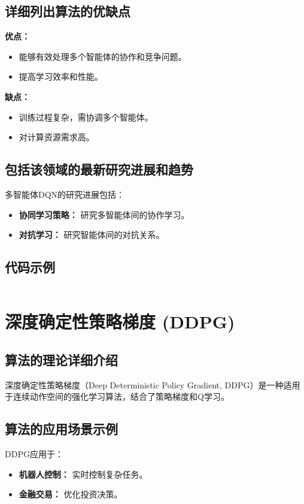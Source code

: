 \subsection*{详细列出算法的优缺点}
\textbf{优点：}
\begin{itemize}
    \item 能够有效处理多个智能体的协作和竞争问题。
    \item 提高学习效率和性能。
\end{itemize}

\textbf{缺点：}
\begin{itemize}
    \item 训练过程复杂，需协调多个智能体。
    \item 对计算资源需求高。
\end{itemize}

\subsection*{包括该领域的最新研究进展和趋势}
多智能体DQN的研究进展包括：
\begin{itemize}
    \item \textbf{协同学习策略：} 研究多智能体间的协作学习。
    \item \textbf{对抗学习：} 研究智能体间的对抗关系。
\end{itemize}
\subsection*{代码示例}
\begin{lstlisting}

\end{lstlisting}


\section{深度确定性策略梯度 (DDPG)}
\subsection*{算法的理论详细介绍}
深度确定性策略梯度（Deep Deterministic Policy Gradient, DDPG）是一种适用于连续动作空间的强化学习算法，结合了策略梯度和Q学习。

\subsection*{算法的应用场景示例}
DDPG应用于：
\begin{itemize}
    \item \textbf{机器人控制：} 实时控制复杂任务。
    \item \textbf{金融交易：} 优化投资决策。
\end{itemize}

